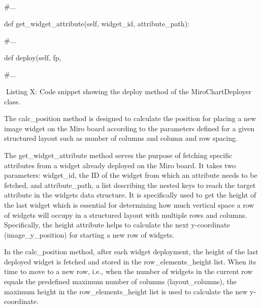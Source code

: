 \documentclass[
]{article}
\begin{document}
\#...

def get\_widget\_attribute(self, widget\_id, attribute\_path):

\#...

def deploy(self, fp,

\#...

Listing X: Code snippet showing the deploy method of the
MiroChartDeployer class.

The calc\_position method is designed to calculate the position for
placing a new image widget on the Miro board according to the parameters
defined for a given structured layout such as number of columns and
column and row spacing.

The get\_widget\_attribute method serves the purpose of fetching
specific attributes from a widget already deployed on the Miro board. It
takes two parameters: widget\_id, the ID of the widget from which an
attribute needs to be fetched, and attribute\_path, a list describing
the nested keys to reach the target attribute in the
widget\textquotesingle s data structure. It is specifically used to get
the height of the last widget which is essential for determining how
much vertical space a row of widgets will occupy in a structured layout
with multiple rows and columns. Specifically, the height attribute helps
to calculate the next y-coordinate (image\_y\_position) for starting a
new row of widgets.

In the calc\_position method, after each widget deployment, the height
of the last deployed widget is fetched and stored in the
row\_elements\_height list. When it\textquotesingle s time to move to a
new row, i.e., when the number of widgets in the current row equals the
predefined maximum number of columns (layout\_columns), the maximum
height in the row\_elements\_height list is used to calculate the new
y-coordinate.
\end{document}
